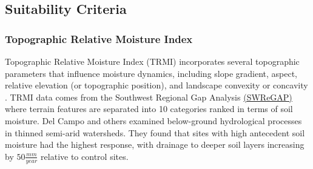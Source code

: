 \documentclass[
  number]{elsarticle}
\begin{document}
\subsection{Suitability Criteria}\label{suitability-criteria}

\subsubsection{Topographic Relative Moisture
Index}\label{topographic-relative-moisture-index}

Topographic Relative Moisture Index (TRMI) incorporates several
topographic parameters that influence moisture dynamics, including slope
gradient, aspect, relative elevation (or topographic position), and
landscape convexity or concavity \citep{parker1982}. TRMI data comes
from the Southwest Regional Gap Analysis
\href{https://swregap.org/data/}{(SWReGAP)} where terrain features are
separated into 10 categories ranked in terms of soil moisture. Del Campo
and others \citep{del_campo_effectiveness_2019} examined below-ground
hydrological processes in thinned semi-arid watersheds. They found that
sites with high antecedent soil moisture had the highest response, with
drainage to deeper soil layers increasing by \(50\frac{mm}{year}\)
relative to control sites.
\end{document}
